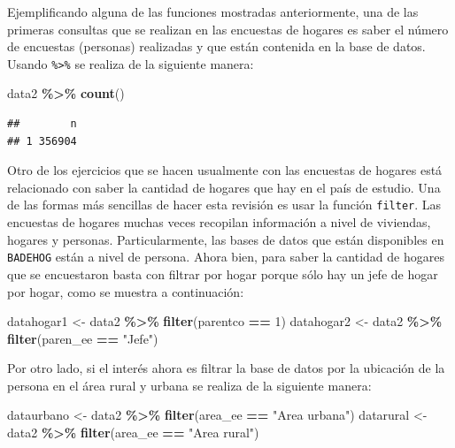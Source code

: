 \documentclass[
  spanish,
  12pt,
]{book}
\newenvironment{Shaded}{\begin{snugshade}}{\end{snugshade}}
\newcommand{\DecValTok}[1]{\textcolor[rgb]{0.00,0.00,0.81}{#1}}
\newcommand{\FunctionTok}[1]{\textcolor[rgb]{0.13,0.29,0.53}{\textbf{#1}}}
\newcommand{\NormalTok}[1]{#1}
\newcommand{\OtherTok}[1]{\textcolor[rgb]{0.56,0.35,0.01}{#1}}
\newcommand{\SpecialCharTok}[1]{\textcolor[rgb]{0.81,0.36,0.00}{\textbf{#1}}}
\newcommand{\StringTok}[1]{\textcolor[rgb]{0.31,0.60,0.02}{#1}}
\begin{document}
Ejemplificando alguna de las funciones mostradas anteriormente, una de las primeras consultas que se realizan en las encuestas de hogares es saber el número de encuestas (personas) realizadas y que están contenida en la base de datos. Usando \texttt{\%\textgreater{}\%} se realiza de la siguiente manera:

\begin{Shaded}
\begin{Highlighting}[]
\NormalTok{data2 }\SpecialCharTok{\%\textgreater{}\%} \FunctionTok{count}\NormalTok{()}
\end{Highlighting}
\end{Shaded}

\begin{verbatim}
##        n
## 1 356904
\end{verbatim}

Otro de los ejercicios que se hacen usualmente con las encuestas de hogares está relacionado con saber la cantidad de hogares que hay en el país de estudio. Una de las formas más sencillas de hacer esta revisión es usar la función \texttt{filter}. Las encuestas de hogares muchas veces recopilan información a nivel de viviendas, hogares y personas. Particularmente, las bases de datos que están disponibles en \texttt{BADEHOG} están a nivel de persona. Ahora bien, para saber la cantidad de hogares que se encuestaron basta con filtrar por hogar porque sólo hay un jefe de hogar por hogar, como se muestra a continuación:

\begin{Shaded}
\begin{Highlighting}[]
\NormalTok{datahogar1 }\OtherTok{\textless{}{-}}\NormalTok{ data2 }\SpecialCharTok{\%\textgreater{}\%} \FunctionTok{filter}\NormalTok{(parentco }\SpecialCharTok{==} \DecValTok{1}\NormalTok{)}
\NormalTok{datahogar2 }\OtherTok{\textless{}{-}}\NormalTok{ data2 }\SpecialCharTok{\%\textgreater{}\%} \FunctionTok{filter}\NormalTok{(paren\_ee }\SpecialCharTok{==} \StringTok{"Jefe"}\NormalTok{) }
\end{Highlighting}
\end{Shaded}

Por otro lado, si el interés ahora es filtrar la base de datos por la ubicación de la persona en el área rural y urbana se realiza de la siguiente manera:

\begin{Shaded}
\begin{Highlighting}[]
\NormalTok{dataurbano }\OtherTok{\textless{}{-}}\NormalTok{ data2 }\SpecialCharTok{\%\textgreater{}\%} 
  \FunctionTok{filter}\NormalTok{(area\_ee }\SpecialCharTok{==} \StringTok{"Area urbana"}\NormalTok{)}
\NormalTok{datarural }\OtherTok{\textless{}{-}}\NormalTok{ data2 }\SpecialCharTok{\%\textgreater{}\%} 
  \FunctionTok{filter}\NormalTok{(area\_ee }\SpecialCharTok{==} \StringTok{"Area rural"}\NormalTok{) }
\end{Highlighting}
\end{Shaded}
\end{document}
